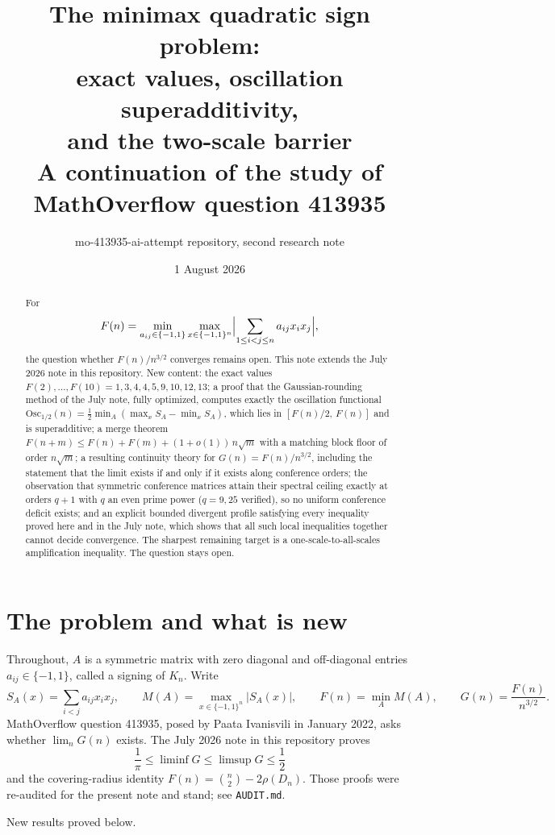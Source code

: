 \documentclass[11pt]{article}
\title{\textbf{The minimax quadratic sign problem:\\
exact values, oscillation superadditivity,\\ and the two-scale barrier}\\[4pt]
\large A continuation of the study of MathOverflow question 413935}
\author{mo-413935-ai-attempt repository, second research note}
\date{1 August 2026}
\theoremstyle{remark}
\newcommand{\eps}{\{-1,1\}}
\newcommand{\Osc}{\mathrm{Osc}}
\begin{document}
\maketitle

\begin{abstract}
For
\[
 F(n)=\min_{a_{ij}\in\eps}\max_{x\in\eps^n}
 \Bigl|\sum_{1\le i<j\le n}a_{ij}x_ix_j\Bigr|,
\]
the question whether $F(n)/n^{3/2}$ converges remains open. This note
extends the July 2026 note in this repository. New content: the exact
values $F(2),\dots,F(10)=1,3,4,4,5,9,10,12,13$; a proof that the
Gaussian-rounding method of the July note, fully optimized, computes
exactly the oscillation functional
$\Osc_{1/2}(n)=\tfrac12\min_A(\max_xS_A-\min_xS_A)$, which lies in
$[F(n)/2,\,F(n)]$ and is superadditive; a merge theorem
$F(n+m)\le F(n)+F(m)+(1+o(1))\,n\sqrt m$ with a matching block floor of
order $n\sqrt m$; a resulting continuity theory for
$G(n)=F(n)/n^{3/2}$, including the statement that the limit exists if
and only if it exists along conference orders; the observation that
symmetric conference matrices attain their spectral ceiling exactly at
orders $q+1$ with $q$ an even prime power ($q=9,25$ verified), so no
uniform conference deficit exists; and an explicit bounded divergent
profile satisfying every inequality proved here and in the July note,
which shows that all such local inequalities together cannot decide
convergence. The sharpest remaining target is a one-scale-to-all-scales
amplification inequality. The question stays open.
\end{abstract}

\section{The problem and what is new}

Throughout, $A$ is a symmetric matrix with zero diagonal and
off-diagonal entries $a_{ij}\in\eps$, called a signing of $K_n$. Write
\[
 S_A(x)=\sum_{i<j}a_{ij}x_ix_j,\qquad
 M(A)=\max_{x\in\eps^n}|S_A(x)|,\qquad
 F(n)=\min_AM(A),\qquad
 G(n)=\frac{F(n)}{n^{3/2}}.
\]
MathOverflow question 413935, posed by Paata Ivanisvili in January
2022, asks whether $\lim_nG(n)$ exists. The July 2026 note in this
repository proves
\[
 \frac1\pi\le\liminf G\le\limsup G\le\frac12
\]
and the covering-radius identity $F(n)=\binom n2-2\rho(D_n)$. Those
proofs were re-audited for the present note and stand; see
\texttt{AUDIT.md}.

New results proved below.
\end{document}
